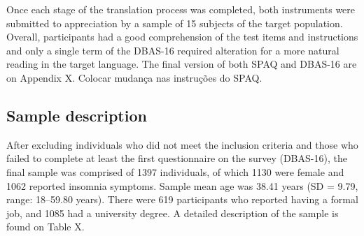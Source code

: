 \documentclass[
  ,doc,11pt, twoside,floatsintext]{apa6}
\begin{document}
Once each stage of the translation process was completed, both instruments were submitted to appreciation by a sample of 15 subjects of the target population. Overall, participants had a good comprehension of the test items and instructions and only a single term of the DBAS-16 required alteration for a more natural reading in the target language. The final version of both SPAQ and DBAS-16 are on Appendix X. Colocar mudança nas instruções do SPAQ.

\hypertarget{sample-description}{%
\subsection{Sample description}\label{sample-description}}

After excluding individuals who did not meet the inclusion criteria and those who failed to complete at least the first questionnaire on the survey (DBAS-16), the final sample was comprised of 1397 individuals, of which 1130 were female and 1062 reported insomnia symptoms. Sample mean age was 38.41 years (SD = 9.79, range: 18--59.80 years). There were 619 participants who reported having a formal job, and 1085 had a university degree. A detailed description of the sample is found on Table X.
\end{document}
